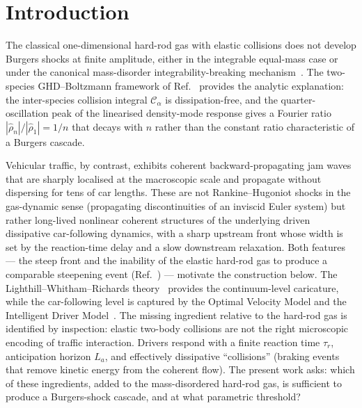 \documentclass[aps,pre,twocolumn,superscriptaddress,longbibliography,floatfix]{revtex4-2}
\begin{document}
\section{Introduction}\label{sec:intro}

The classical one-dimensional hard-rod gas with elastic
collisions does not develop Burgers shocks at finite amplitude,
either in the integrable equal-mass case
\cite{HubnerDoyon2024,PaperIII} or under the canonical
mass-disorder integrability-breaking
mechanism~\cite{PaperIII}. The two-species GHD--Boltzmann
framework of Ref.~\cite{PaperIV} provides the analytic
explanation: the inter-species collision integral
$\mathcal{C}_\alpha$ is dissipation-free, and the
quarter-oscillation peak of the linearised density-mode
response gives a Fourier ratio
$|\hat\rho_n|/|\hat\rho_1|=1/n$ that decays with $n$ rather
than the constant ratio characteristic of a Burgers cascade.

Vehicular traffic, by contrast, exhibits coherent
backward-propagating jam waves~\cite{Sugiyama2008} that are
sharply localised at the macroscopic scale and propagate
without dispersing for tens of car lengths. These are not
Rankine--Hugoniot shocks in the gas-dynamic sense
(propagating discontinuities of an inviscid Euler system)
but rather long-lived nonlinear coherent structures of the
underlying driven dissipative car-following dynamics, with
a sharp upstream front whose width is set by the
reaction-time delay and a slow downstream relaxation. Both
features --- the steep front and the inability of the
elastic hard-rod gas to produce a comparable steepening
event (Ref.~\cite{PaperIII}) --- motivate the construction
below. The Lighthill--Whitham--Richards
theory~\cite{Lighthill1955} provides the continuum-level
caricature, while the car-following level is captured by
the Optimal Velocity Model
\cite{Bando1995,Komatsu1995,Komatsu2003} and the Intelligent
Driver Model~\cite{Treiber2000}. The missing ingredient
relative to the hard-rod gas is identified by inspection:
elastic two-body collisions are not the right microscopic
encoding of traffic interaction. Drivers respond with a finite
reaction time $\tau_r$, anticipation horizon $L_a$, and
effectively dissipative ``collisions'' (braking events that
remove kinetic energy from the coherent flow). The present
work asks: which of these ingredients, added to the
mass-disordered hard-rod gas, is sufficient to produce a
Burgers-shock cascade, and at what parametric threshold?
\end{document}
